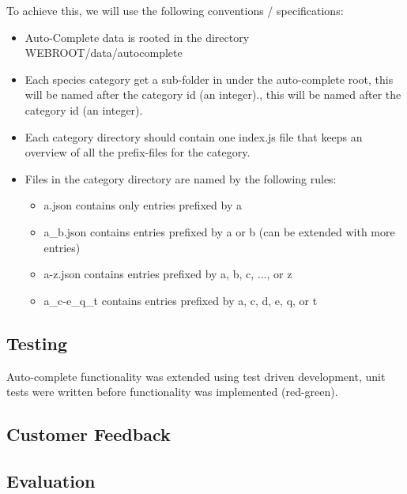 	To achieve this, we will use the following conventions / specifications:

	\begin{itemize}
		\item Auto-Complete data is rooted in the directory WEBROOT/data/autocomplete
		\item Each species category get a sub-folder in under the auto-complete
		root, this will be named after the category id (an integer)., this will
		be named after the category id (an integer).
		\item Each category directory should contain one index.js file that
		keeps an overview of all the prefix-files for the category.
		\item Files in the category directory are named by the following rules:
			\begin{itemize}
				\item a.json contains only entries prefixed by a
				\item a\_b.json contains entries prefixed by a or b (can be
				extended with more entries)
				\item a-z.json contains entries prefixed by a, b, c, ..., or z
				\item a\_c-e\_q\_t contains entries prefixed by a, c, d, e, q, or t
			\end{itemize}
	\end{itemize}

\subsection{Testing}

Auto-complete functionality was extended using test driven development, unit
tests were written before functionality was implemented (red-green).

\subsection{Customer Feedback}

\subsection{Evaluation}
